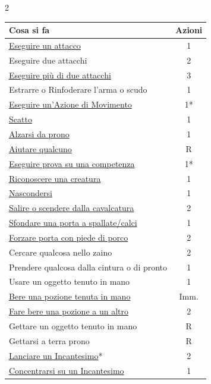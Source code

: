 \begin{multicols}{2}
\noindent\begin{tabularx}{1\linewidth}{Xc}
	\toprule
\rowcolor{gray!20}\textbf{Cosa si fa} & \textbf{Azioni}\\
\toprule
\hyperlink{tiropercolpireedifesa}{Eseguire un attacco}& 1\\
\rowcolor{gray!20}Eseguire due attacchi& 2\\
\hyperlink{attacchimultiplimischia}{Eseguire più di due attacchi}& 3\\
\rowcolor{gray!20}Estrarre o Rinfoderare l'arma o scudo& 1\\
\midrule
\hyperlink{tipodimovimento}{Eseguire un'Azione di Movimento} &1*\\
\rowcolor{gray!20}\hyperlink{azionediscatto}{Scatto} & 1\\
\hyperlink{alzarsidaprono}{Alzarsi da prono}& 1\\
\midrule
\rowcolor{gray!20}\hyperlink{aiutare}{Aiutare qualcuno}& R\\
\hyperlink{esempiprovecompetenze}{Eseguire prova su una competenza}& 1*\\
\rowcolor{gray!20}\hyperlink{riconosceremostro}{Riconoscere una creatura}& 1\\
\hyperlink{copertura}{Nascondersi}& 1\\
\midrule
\rowcolor{gray!20}\hyperlink{cavalcare}{Salire o scendere dalla cavalcatura}& 2\\
\hyperlink{sfondare}{Sfondare una porta a spallate/calci}& 1\\
\rowcolor{gray!20}\hyperlink{piedediporco}{Forzare porta con piede di porco}& 2\\
\midrule
Cercare qualcosa nello zaino& 2\\
\rowcolor{gray!20}Prendere qualcosa dalla cintura o di pronto & 1\\
Usare un oggetto tenuto in mano& 1\\
\midrule
\rowcolor{gray!20}\hyperlink{insorgenzaveleno}{Bere una pozione tenuta in mano}& Imm.\\
\hyperlink{insorgenzaveleno}{Fare bere una pozione a un altro} & 2\\
\midrule
\rowcolor{gray!20}Gettare un oggetto tenuto in mano& R\\
Gettarsi a terra prono& R\\
\midrule
\rowcolor{gray!20}\hyperlink{magietempodilancio}{Lanciare un Incantesimo}*& 2\\
\hyperlink{magieconcentrazione}{Concentrarsi su un Incantesimo}& 1\\

\end{tabularx}
\end{multicols}
